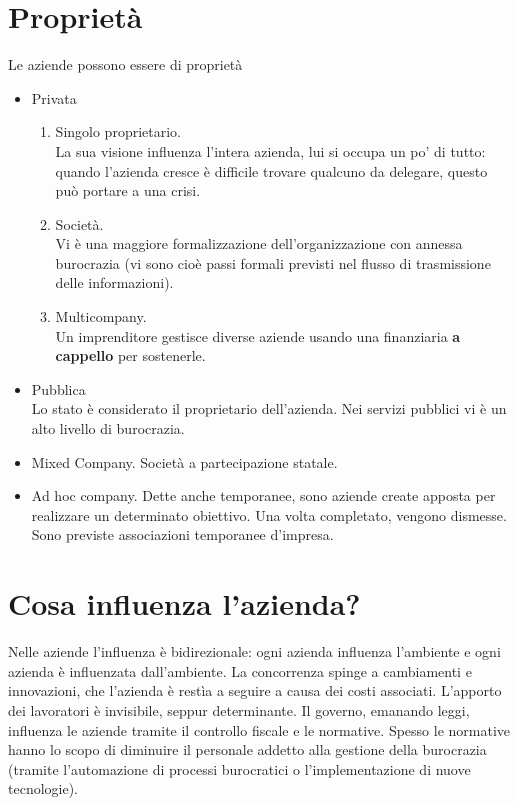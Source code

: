 \section{Propriet\`a}
Le aziende possono essere di propriet\`a
\begin{itemize}
\item Privata
\begin{enumerate}
\item Singolo proprietario. \\ La sua visione influenza l'intera azienda, lui si occupa un po' di tutto: quando l'azienda cresce \`e difficile trovare qualcuno da delegare, questo pu\`o portare a una crisi.
\item Societ\`a. \\ Vi \`e una maggiore formalizzazione dell'organizzazione con annessa burocrazia (vi sono cio\`e passi formali previsti nel flusso di trasmissione delle informazioni).
\item Multicompany. \\ Un imprenditore gestisce diverse aziende usando una finanziaria \textbf{a cappello} per sostenerle.
\end{enumerate}
\item Pubblica \\ Lo stato \`e considerato il proprietario dell'azienda. Nei servizi pubblici vi \`e un alto livello di burocrazia.
\item Mixed Company. Societ\`a a partecipazione statale.
\item Ad hoc company. Dette anche temporanee, sono aziende create apposta per realizzare un determinato obiettivo. Una volta completato, vengono dismesse. Sono previste associazioni temporanee d'impresa.
\end{itemize}

\section{Cosa influenza l'azienda?}
Nelle aziende l'influenza \`e bidirezionale: ogni azienda influenza l'ambiente e ogni azienda \`e influenzata dall'ambiente.
La concorrenza spinge a cambiamenti e innovazioni, che l'azienda \`e rest\`ia a seguire a causa dei costi associati.
L'apporto dei lavoratori \`e invisibile, seppur determinante.
Il governo, emanando leggi, influenza le aziende tramite il controllo fiscale e le normative. Spesso le normative hanno lo scopo di diminuire il personale addetto alla gestione della burocrazia (tramite l'automazione di processi burocratici o l'implementazione di nuove tecnologie).
